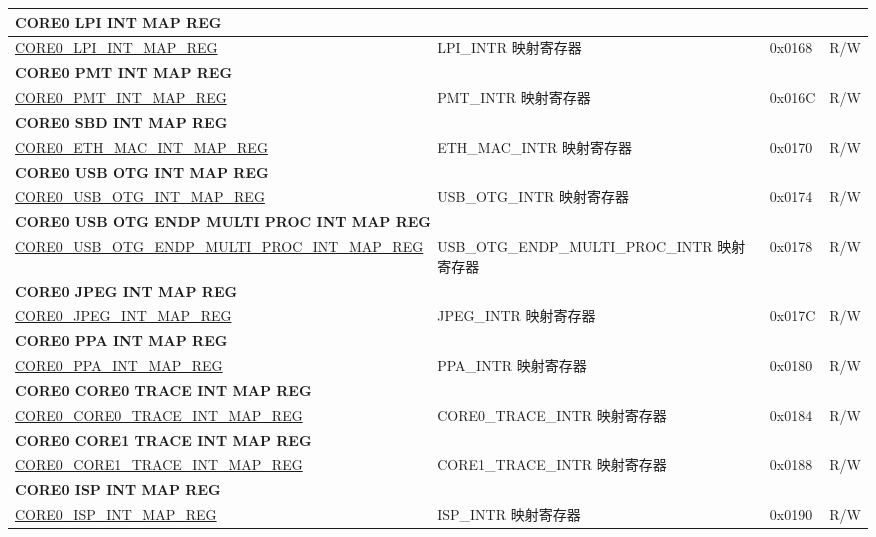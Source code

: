 \begin{longtable}{ | p{8.7cm} | p{6.2cm} | p{1.3cm} | p{1cm} | }
\multicolumn{4}{|l|}{\textbf{CORE0 LPI INT MAP REG}} \\ \hline
\hyperref[regdesc:CORE0LPIINTMAPREG]{CORE0\_LPI\_INT\_MAP\_REG} & LPI\_INTR 映射寄存器 & 0x0168 & R/W \\ \hline
\multicolumn{4}{|l|}{\textbf{CORE0 PMT INT MAP REG}} \\ \hline
\hyperref[regdesc:CORE0PMTINTMAPREG]{CORE0\_PMT\_INT\_MAP\_REG} & PMT\_INTR 映射寄存器 & 0x016C & R/W \\ \hline
\multicolumn{4}{|l|}{\textbf{CORE0 SBD INT MAP REG}} \\ \hline
\hyperref[regdesc:CORE0SBDINTMAPREG]{CORE0\_ETH\_MAC\_INT\_MAP\_REG} & ETH\_MAC\_INTR 映射寄存器 & 0x0170 & R/W \\ \hline
\multicolumn{4}{|l|}{\textbf{CORE0 USB OTG INT MAP REG}} \\ \hline
\hyperref[regdesc:CORE0USBOTGINTMAPREG]{CORE0\_USB\_OTG\_INT\_MAP\_REG} & USB\_OTG\_INTR 映射寄存器 & 0x0174 & R/W \\ \hline
\multicolumn{4}{|l|}{\textbf{CORE0 USB OTG ENDP MULTI PROC INT MAP REG}} \\ \hline
\hyperref[regdesc:CORE0USBOTGENDPMULTIPROCINTMAPREG]{CORE0\_USB\_OTG\_ENDP\_MULTI\_PROC\_INT\_MAP\_REG} & USB\_OTG\_ENDP\_MULTI\_PROC\_INTR 映射寄存器 & 0x0178 & R/W \\ \hline
\multicolumn{4}{|l|}{\textbf{CORE0 JPEG INT MAP REG}} \\ \hline
\hyperref[regdesc:CORE0JPEGINTMAPREG]{CORE0\_JPEG\_INT\_MAP\_REG} & JPEG\_INTR 映射寄存器 & 0x017C & R/W \\ \hline
\multicolumn{4}{|l|}{\textbf{CORE0 PPA INT MAP REG}} \\ \hline
\hyperref[regdesc:CORE0PPAINTMAPREG]{CORE0\_PPA\_INT\_MAP\_REG} & PPA\_INTR 映射寄存器 & 0x0180 & R/W \\ \hline
\multicolumn{4}{|l|}{\textbf{CORE0 CORE0 TRACE INT MAP REG}} \\ \hline
\hyperref[regdesc:CORE0CORE0TRACEINTMAPREG]{CORE0\_CORE0\_TRACE\_INT\_MAP\_REG} & CORE0\_TRACE\_INTR 映射寄存器 & 0x0184 & R/W \\ \hline
\multicolumn{4}{|l|}{\textbf{CORE0 CORE1 TRACE INT MAP REG}} \\ \hline
\hyperref[regdesc:CORE0CORE1TRACEINTMAPREG]{CORE0\_CORE1\_TRACE\_INT\_MAP\_REG} & CORE1\_TRACE\_INTR 映射寄存器 & 0x0188 & R/W \\ \hline
\multicolumn{4}{|l|}{\textbf{CORE0 ISP INT MAP REG}} \\ \hline
\hyperref[regdesc:CORE0ISPINTMAPREG]{CORE0\_ISP\_INT\_MAP\_REG} & ISP\_INTR 映射寄存器 & 0x0190 & R/W \\ \hline

\end{longtable}
